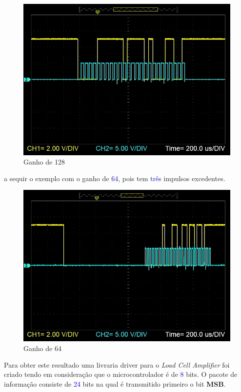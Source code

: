 \\
\begin{figure}[H]
	\centering
	\includegraphics[scale=0.35]{./image/PESTA/graph/80SPS128GAIN/Gain_128_example.JPG}
	\caption{Ganho de 128}
	\label{Gain_128_example}
\end{figure}
a sequir o exemplo com o ganho de \textcolor{blue}{64}, pois tem \textcolor{blue}{três} impulsos excedentes.
\begin{figure}[H]
	\centering
	\includegraphics[scale=0.35]{./image/PESTA/graph/80SPS64GAIN/Gain_64_example.JPG}
	\caption{Ganho de 64}
	\label{Gain_64_example}
\end{figure}
Para obter este resultado uma livraria driver para o \textit{Load Cell Amplifier} foi criado tendo em consideração que o microcontrolador é de \textcolor{blue}{8} bits. O pacote de informação consiste de \textcolor{blue}{24} bits na qual é transmitido primeiro o bit \textbf{MSB}.
